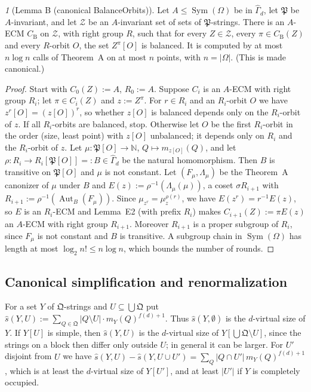 \documentclass[11pt]{article}
\theoremstyle{plain}
\theoremstyle{definition}
\theoremstyle{remark}
\theoremstyle{named}
\newtheorem*{named}{}
\theoremstyle{namedrm}
\newcommand{\Sym}{\operatorname{Sym}}
\newcommand{\Aut}{\operatorname{Aut}}
\newcommand{\Gd}{\widehat{\Gamma}_d}
\newcommand{\fP}{\mathfrak{P}}
\newcommand{\cZ}{\mathcal{Z}}
\begin{document}
\begin{named}[Lemma B (canonical BalanceOrbits)]
Let $A\le\Sym(\Omega)$ be in $\Gd$, let $\fP$ be $A$-invariant, and let $\cZ$ be an $A$-invariant set of sets of $\fP$-strings. There is
an $A$-ECM $C_{\mathrm B}$ on $\cZ$, with right group $R$, such that for every $Z\in\cZ$, every $\pi\in C_{\mathrm B}(Z)$ and every
$R$-orbit $O$, the set $Z^\pi[O]$ is balanced. It is computed by at most $n\log n$ calls of Theorem~A on at most
$n$ points, with $n=|\Omega|$. (This is \cite[Lemma~4.3]{Neu20} made canonical.)
\end{named}
\begin{proof}
Start with $C_0(Z):=A$, $R_0:=A$. Suppose $C_i$ is an $A$-ECM with right group $R_i$; let $\pi\in C_i(Z)$ and $z:=Z^\pi$. For
$r\in R_i$ and an $R_i$-orbit $O$ we have $z^r[O]=(z[O])^r$, so whether $z[O]$ is balanced depends only on the
$R_i$-orbit of $z$. If all $R_i$-orbits are balanced, stop. Otherwise let $O$ be the first $R_i$-orbit in the order
(size, least point) with $z[O]$ unbalanced; it depends only on $R_i$ and the $R_i$-orbit of $z$. Let
$\mu\colon\fP[O]\to\mathbb N$, $Q\mapsto m_{z[O]}(Q)$, and let $\rho\colon R_i\to R_i[\fP[O]]=:B\in\Gd$ be the natural
homomorphism. Then $B$ is transitive on $\fP[O]$ and $\mu$ is not constant. Let $(F_\mu,\Lambda_\mu)$ be the Theorem~A
canonizer of $\mu$ under $B$ and $E(z):=\rho^{-1}(\Lambda_\mu(\mu))$, a coset $\sigma R_{i+1}$ with
$R_{i+1}:=\rho^{-1}(\Aut_B(F_\mu))$. Since $\mu_{z^r}=\mu_z^{\rho(r)}$, we have $E(z^r)=r^{-1}E(z)$, so $E$ is an $R_i$-ECM and
Lemma~E2 (with prefix $R_i$) makes $C_{i+1}(Z):=\pi E(z)$ an $A$-ECM with right group $R_{i+1}$. Moreover $R_{i+1}$ is a
proper subgroup of $R_i$, since $F_\mu$ is not constant and $B$ is transitive. A subgroup chain in $\Sym(\Omega)$ has length
at most $\log_2 n!\le n\log n$, which bounds the number of rounds.
\end{proof}

\subsection{Canonical simplification and renormalization}

For a set $Y$ of $\mathfrak Q$-strings and $U\subseteq\bigcup\mathfrak Q$ put $\widehat s(Y,U):=\sum_{Q\in\mathfrak Q}|Q\setminus U|\cdot m_Y(Q)^{f(d)+1}$.
Thus $\widehat s(Y,\emptyset)$ is the $d$-virtual size of $Y$. If $Y[U]$ is simple, then $\widehat s(Y,U)$ is the
$d$-virtual size of $Y[\bigcup\mathfrak Q\setminus U]$, since the strings on a block then differ only outside $U$; in
general it can be larger. For $U'$ disjoint from $U$ we have
$\widehat s(Y,U)-\widehat s(Y,U\cup U')=\sum_{Q}|Q\cap U'|\,m_Y(Q)^{f(d)+1}$, which is at least the $d$-virtual size of
$Y[U']$, and at least $|U'|$ if $Y$ is completely occupied.
\end{document}

